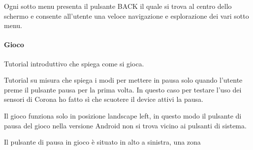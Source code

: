 		Ogni sotto menu presenta il pulsante BACK il quale si trova al centro dello schermo e consente all'utente una veloce navigazione e esplorazione dei vari sotto menu.
		
		\paragraph{Gioco}
		Tutorial introduttivo che spiega come si gioca.
		
		Tutorial su misura che spiega i modi per mettere in pausa solo quando l'utente preme il pulsante pausa per la prima volta. In questo caso per testare l'uso dei sensori di Corona ho fatto sì che scuotere il device attivi la pausa.
		
		Il gioco funziona solo in posizione landscape left, in questo modo il pulsante di pausa del gioco nella versione Android non si trova vicino ai pulsanti di sistema.
		
		Il pulsante di pausa in gioco è situato in alto a sinistra, una zona
		
	\newpage
		
